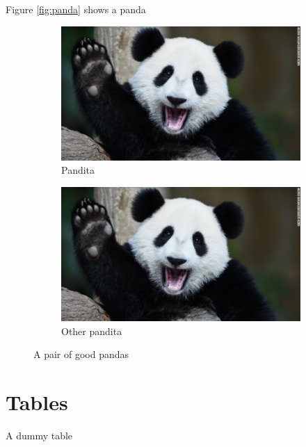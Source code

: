 \documentclass{article}
\begin{document}
Figure \ref{fig:panda} shows a panda

\begin{figure}[h!]
    \centering
    \begin{subfigure}[b]{0.4\linewidth} %
        \includegraphics[width=\linewidth]{images/panda.jpg}
        \caption{Pandita}
    \end{subfigure}
    \begin{subfigure}[b]{0.4\linewidth}
        \includegraphics[width=\linewidth]{images/panda.jpg}
        \caption{Other pandita}
    \end{subfigure}
    \caption{A pair of good pandas}
\end{figure}

\section{Tables}

\begin{table}
    \caption{A dummy table}
\end{table}

\newpage

\begin{appendix}
    \listoffigures
    \listoftables
\end{appendix}
\newpage
\end{document}
